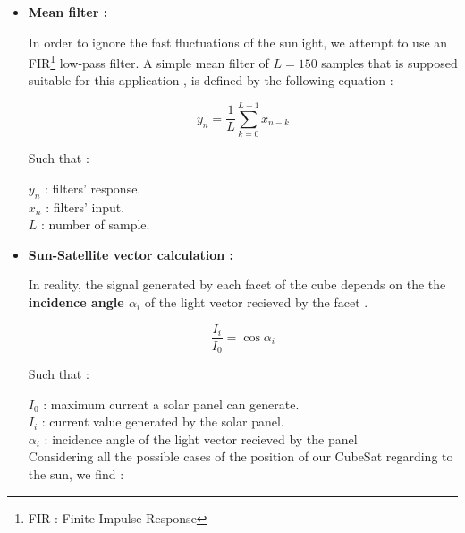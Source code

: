 \documentclass[a4paper, 12pt]{article}
\begin{document}
\begin{itemize}

\item \textbf{Mean filter : } 

In order to ignore the fast fluctuations of the sunlight, we attempt to use an FIR\footnote{FIR : Finite Impulse Response} low-pass filter. A simple mean filter of $L=150$ samples that is supposed suitable for this application  \cite{nurgizat_solar_2021}, is defined by the following equation : 

\begin{equation} \label{eq:filter}
y_n = \frac{1}{L} \sum_{k=0}^{L-1} x_{n-k}
\end{equation}

Such that : 

$y_n$ : filters' response.\\
$x_n$ : filters' input.\\
$L$ : number of sample.\\

\newpage
\item \textbf{Sun-Satellite vector calculation : } 

In reality, the signal generated by each facet of the cube depends on the the \textbf{incidence angle $\alpha_i$} of the light vector recieved by the facet \cite{nurgizat_low-cost_2023}.


\begin{equation} \label{eq:cos}
\frac{I_i}{I_0} = \cos \alpha_i
\end{equation}




Such that : 

$I_0$ : maximum current a solar panel can generate.\\
$I_i$ : current value generated by the solar panel.\\
$\alpha_i$ : incidence angle of the light vector recieved by the panel\\


Considering all the possible cases of the position of our CubeSat regarding to the sun, we find :\vspace{1cm}


\end{itemize}
\end{document}
